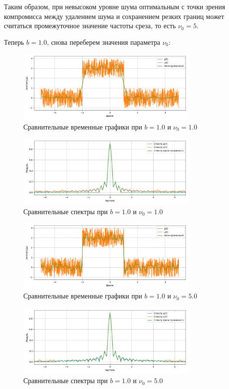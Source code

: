 \documentclass[a4paper]{article}
\begin{document}
Таким образом, при невысоком уровне шума оптимальным с точки зрения компромисса между удалением шума и сохранением резких границ может считаться промежуточное значение частоты среза, то есть $\nu_0=5$.

Теперь $b=1.0$, снова переберем значения параметра $\nu_0$:
\begin{figure}[H]
    \centering
    \includegraphics[width=0.8\textwidth]{src/lpf/time_1.0_1.0.png}
    \caption{Сравнительные временные графики при $b=1.0$ и $\nu_0=1.0$}
\end{figure}
\begin{figure}[H]
    \centering
    \includegraphics[width=0.8\textwidth]{src/lpf/spec_1.0_1.0.png}
    \caption{Сравнительные спектры при $b=1.0$ и $\nu_0=1.0$}
\end{figure}
\begin{figure}[H]
    \centering
    \includegraphics[width=0.8\textwidth]{src/lpf/time_1.0_5.0.png}
    \caption{Сравнительные временные графики при $b=1.0$ и $\nu_0=5.0$}
\end{figure}
\begin{figure}[H]
    \centering
    \includegraphics[width=0.8\textwidth]{src/lpf/spec_1.0_5.0.png}
    \caption{Сравнительные спектры при $b=1.0$ и $\nu_0=5.0$}
\end{figure}
\end{document}
